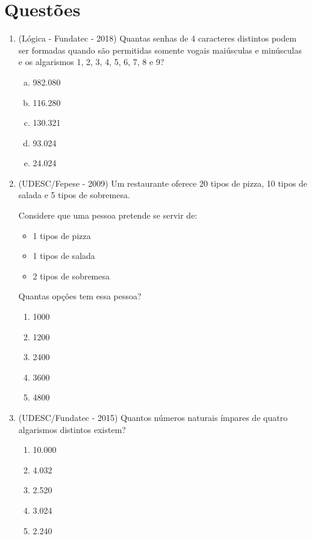 \section{Questões}

\begin{enumerate}
 \item (Lógica - Fundatec - 2018) Quantas senhas de 4 caracteres distintos podem ser formadas quando são permitidas somente vogais maiúsculas e minúsculas e os algarismos 1, 2, 3, 4, 5, 6, 7, 8 e 9?
\begin{multicols}{2} 
\begin{enumerate}[a)]
\item 982.080
\item 116.280
\item 130.321
\item 93.024
\item 24.024
\end{enumerate}
\end{multicols}

 \item (UDESC/Fepese - 2009) Um restaurante oferece 20 tipos de pizza, 10 tipos de salada e 5 tipos de sobremesa.
  
  Considere que uma pessoa pretende se servir de:
  \begin{itemize}
   \item 1 tipos de pizza
   \item 1 tipos de salada
   \item 2 tipos de sobremesa
  \end{itemize}
  
  Quantas opções tem essa pessoa?

  \begin{enumerate}
  \item 1000
  \item 1200
  \item 2400
  \item 3600
  \item 4800
 \end{enumerate}
 
 \newpage
 \item (UDESC/Fundatec - 2015) Quantos números naturais ímpares de quatro algarismos distintos existem?
 \begin{enumerate}
 \item 10.000
 \item 4.032
 \item 2.520
 \item 3.024
 \item 2.240
 \end{enumerate}
 

\end{enumerate}
